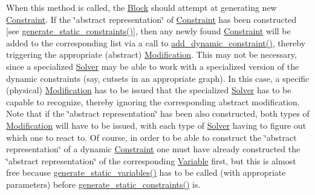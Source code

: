 When this method is called, the \mbox{\hyperlink{class_s_m_spp__di__unipi__it_1_1_block}{Block}} should attempt at generating new \mbox{\hyperlink{class_s_m_spp__di__unipi__it_1_1_constraint}{Constraint}}. If the \char`\"{}abstract representation\char`\"{} of \mbox{\hyperlink{class_s_m_spp__di__unipi__it_1_1_constraint}{Constraint}} has been constructed \mbox{[}see \mbox{\hyperlink{class_s_m_spp__di__unipi__it_1_1_block_add9b4c918157bda66b5183f67953d49b}{generate\+\_\+static\+\_\+constraints()}}\mbox{]}, then any newly found \mbox{\hyperlink{class_s_m_spp__di__unipi__it_1_1_constraint}{Constraint}} will be added to the corresponding list via a call to \mbox{\hyperlink{class_s_m_spp__di__unipi__it_1_1_block_af8871ad704bc4e8f3109a26103bfb3ff}{add\+\_\+dynamic\+\_\+constraint()}}, thereby triggering the appropriate (abstract) \mbox{\hyperlink{class_s_m_spp__di__unipi__it_1_1_modification}{Modification}}. This may not be necessary, since a specialized \mbox{\hyperlink{class_s_m_spp__di__unipi__it_1_1_solver}{Solver}} may be able to work with a specialized version of the dynamic constraints (say, cutsets in an appropriate graph). In this case, a specific (physical) \mbox{\hyperlink{class_s_m_spp__di__unipi__it_1_1_modification}{Modification}} has to be issued that the specialized \mbox{\hyperlink{class_s_m_spp__di__unipi__it_1_1_solver}{Solver}} has to be capable to recognize, thereby ignoring the corresponding abstract modification. Note that if the \char`\"{}abstract representation\char`\"{} has been also constructed, both types of \mbox{\hyperlink{class_s_m_spp__di__unipi__it_1_1_modification}{Modification}} will have to be issued, with each type of \mbox{\hyperlink{class_s_m_spp__di__unipi__it_1_1_solver}{Solver}} having to figure out which one to react to. Of course, in order to be able to construct the \char`\"{}abstract representation\char`\"{} of a dynamic \mbox{\hyperlink{class_s_m_spp__di__unipi__it_1_1_constraint}{Constraint}} one must have already constructed the \char`\"{}abstract representation\char`\"{} of the corresponding \mbox{\hyperlink{class_s_m_spp__di__unipi__it_1_1_variable}{Variable}} first, but this is almost free because \mbox{\hyperlink{class_s_m_spp__di__unipi__it_1_1_block_acd79fd0980af547f2f06241cb989094e}{generate\+\_\+static\+\_\+variables()}} has to be called (with appropriate parameters) before \mbox{\hyperlink{class_s_m_spp__di__unipi__it_1_1_block_add9b4c918157bda66b5183f67953d49b}{generate\+\_\+static\+\_\+constraints()}} is.

